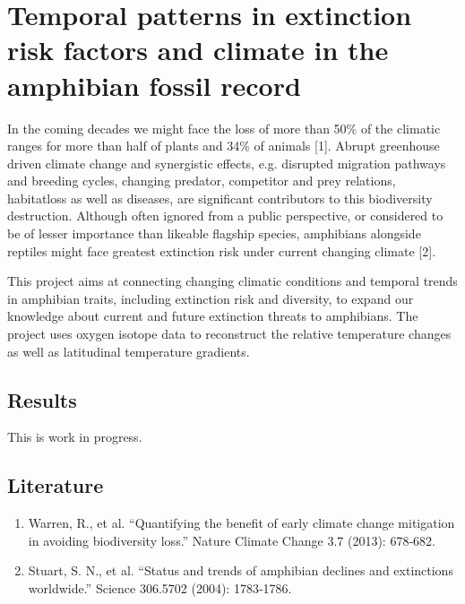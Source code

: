 \documentclass[]{article}
\title{}
\author{}
\date{}
\providecommand{\tightlist}{%
  \setlength{\itemsep}{0pt}\setlength{\parskip}{0pt}}
\begin{document}
{
\setcounter{tocdepth}{2}
\tableofcontents
}
\section{Temporal patterns in extinction risk factors and climate in the
amphibian fossil
record}\label{temporal-patterns-in-extinction-risk-factors-and-climate-in-the-amphibian-fossil-record}

In the coming decades we might face the loss of more than 50\% of the
climatic ranges for more than half of plants and 34\% of animals
{[}1{]}. Abrupt greenhouse driven climate change and synergistic
effects, e.g. disrupted migration pathways and breeding cycles, changing
predator, competitor and prey relations, habitatloss as well as
diseases, are significant contributors to this biodiversity destruction.
Although often ignored from a public perspective, or considered to be of
lesser importance than likeable flagship species, amphibians alongside
reptiles might face greatest extinction risk under current changing
climate {[}2{]}.

This project aims at connecting changing climatic conditions and
temporal trends in amphibian traits, including extinction risk and
diversity, to expand our knowledge about current and future extinction
threats to amphibians. The project uses oxygen isotope data to
reconstruct the relative temperature changes as well as latitudinal
temperature gradients.

\subsection{Results}\label{results}

This is work in progress.

\subsection{Literature}\label{literature}

\begin{enumerate}
\def\labelenumi{\arabic{enumi}.}
\tightlist
\item
  Warren, R., et al. ``Quantifying the benefit of early climate change
  mitigation in avoiding biodiversity loss.'' Nature Climate Change 3.7
  (2013): 678‐682.
\item
  Stuart, S. N., et al. ``Status and trends of amphibian declines and
  extinctions worldwide.'' Science 306.5702 (2004): 1783‐1786.
\end{enumerate}
\end{document}
